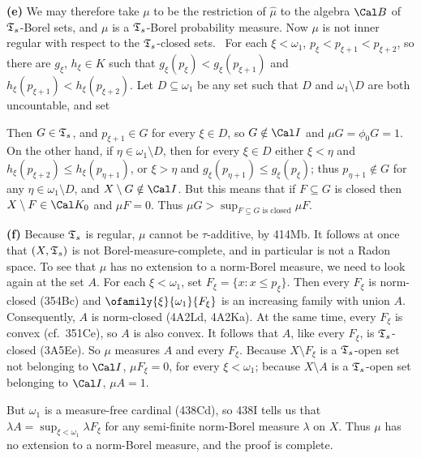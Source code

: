 {{\bf (e)} We may therefore take $\mu$ to be the restriction of $\hat\mu$
to the algebra $\Cal B$ of $\frak T_s$-Borel sets,
and $\mu$ is a $\frak T_s$-Borel probability
measure.   Now $\mu$ is not inner regular with respect to the
$\frak T_s$-closed
sets.   \Prf\ For each $\xi<\omega_1$, $p_{\xi}<p_{\xi+1}<p_{\xi+2}$, so
there are $g_{\xi}$, $h_{\xi}\in K$ such that
$g_{\xi}(p_{\xi})<g_{\xi}(p_{\xi+1})$ and
$h_{\xi}(p_{\xi+1})<h_{\xi}(p_{\xi+2})$.   Let $D\subseteq\omega_1$ be
any set such that $D$ and $\omega_1\setminus D$ are both uncountable,
and set


\noindent Then $G\in\frak T_s$, and
$p_{\xi+1}\in G$ for every $\xi\in D$,
so $G\notin\Cal I$ and $\mu G=\phi_0G=1$.   On the other hand, if
$\eta\in\omega_1\setminus D$, then for every $\xi\in D$ either
$\xi<\eta$ and $h_{\xi}(p_{\xi+2})\le h_{\xi}(p_{\eta+1})$, or
$\xi>\eta$ and $g_{\xi}(p_{\eta+1})\le g_{\xi}(p_{\xi})$;  thus
$p_{\eta+1}\notin G$ for any $\eta\in\omega_1\setminus D$, and
$X\setminus G\notin\Cal I$.   But this means that if $F\subseteq G$ is
closed then $X\setminus F\in\Cal K_0$ and $\mu F=0$.   Thus
$\mu G>\sup_{F\subseteq G\text{ is closed}}\mu F$.\ \Qed

\medskip

{\bf (f)} Because $\frak T_s$ is regular, $\mu$ cannot
be $\tau$-additive, by 414Mb.   It follows at once that $(X,\frak T_s)$
is not Borel-measure-complete, and in particular is not a Radon space.
To see that $\mu$ has no extension to a
norm-Borel measure, we need to look again at the set $A$.
For each $\xi<\omega_1$, set $F_{\xi}=\{x:x\le p_{\xi}\}$.   Then every
$F_{\xi}$ is norm-closed (354Bc) and $\ofamily{\xi}{\omega_1}{F_{\xi}}$
is an increasing family with union $A$.   Consequently, $A$ is
norm-closed (4A2Ld, 4A2Ka).   At the same time, every $F_{\xi}$ is
convex (cf.\ 351Ce), so $A$ is also convex.   It follows that $A$, like
every $F_{\xi}$, is
$\frak T_s$-closed (3A5Ee).   So $\mu$ measures $A$ and every $F_{\xi}$.
Because $X\setminus F_{\xi}$ is a $\frak T_s$-open set not belonging to
$\Cal I$, $\mu F_{\xi}=0$, for every $\xi<\omega_1$;  because
$X\setminus A$ is a $\frak T_s$-open set belonging to $\Cal I$,
$\mu A=1$.

But $\omega_1$ is a measure-free cardinal (438Cd), so 438I tells us
that $\lambda A=\sup_{\xi<\omega_1}\lambda F_{\xi}$ for any
semi-finite norm-Borel measure $\lambda$ on $X$.   Thus $\mu$ has no
extension to a norm-Borel measure, and the proof is complete.
}%

